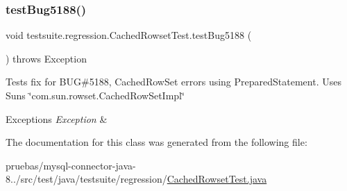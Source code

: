 \subsubsection{\texorpdfstring{test\+Bug5188()}{testBug5188()}}
{\footnotesize\ttfamily void testsuite.\+regression.\+Cached\+Rowset\+Test.\+test\+Bug5188 (\begin{DoxyParamCaption}{ }\end{DoxyParamCaption}) throws Exception}

Tests fix for B\+UG\#5188, Cached\+Row\+Set errors using Prepared\+Statement. Uses Sun\textquotesingle{}s \char`\"{}com.\+sun.\+rowset.\+Cached\+Row\+Set\+Impl\char`\"{}


\begin{DoxyExceptions}{Exceptions}
{\em Exception} & \\
\hline
\end{DoxyExceptions}


The documentation for this class was generated from the following file\+:\begin{DoxyCompactItemize}
\item 
pruebas/mysql-\/connector-\/java-\/8../src/test/java/testsuite/regression/\mbox{\hyperlink{_cached_rowset_test_8java}{Cached\+Rowset\+Test.\+java}}\end{DoxyCompactItemize}
